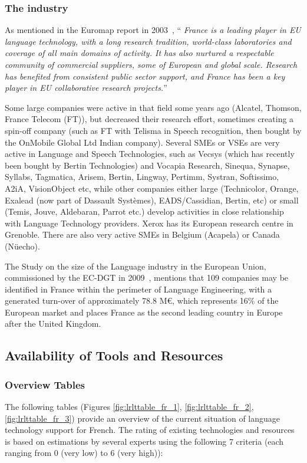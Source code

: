 \begin{multicols}{2}
\subsubsection{The industry}

As mentioned in the Euromap report in 2003~\cite{euromap}, ``{\em
  France is a leading player in EU language technology, with a long
  research tradition, world-class laboratories and coverage of all
  main domains of activity. It has also nurtured a respectable
  community of commercial suppliers, some of European and global
  scale. Research has benefited from consistent public sector support,
  and France has been a key player in EU collaborative research
  projects.}''

Some large companies were active in that field some years ago
(Alcatel, Thomson, France Telecom (FT)), but decreased their research
effort, sometimes creating a spin-off company (such as FT with Telisma
in Speech recognition, then bought by the OnMobile Global Ltd Indian
company). Several SMEs or VSEs are very active in Language and Speech
Technologies, such as Vecsys (which has recently been bought by Bertin
Technologies) and Vocapia Research, Sinequa, Synapse, Syllabs,
Tagmatica, Arisem, Bertin, Lingway, Pertimm, Systran, Softissimo,
A2iA, VisionObject etc, while other companies either large
(Technicolor, Orange, Exalead (now part of Dassault Systèmes),
EADS/Cassidian, Bertin, etc) or small (Temis, Jouve, Aldebaran, Parrot
etc.) develop activities in close relationship with Language
Technology providers. Xerox has its European research centre in
Grenoble. There are also very active SMEs in Belgium (Acapela) or
Canada (Nüecho).

The Study on the size of the Language industry in the European Union,
commissioned by the EC-DGT in 2009~\cite{dgt08}, mentions that 109 companies may
be identified in France within the perimeter of Language Engineering,
with a generated turn-over of approximately 78.8 M€, which represents
16\% of the European market and places France as the second leading
country in Europe after the United Kingdom.

\subsection{Availability of Tools and Resources}

\subsubsection{Overview Tables}
The following tables (Figures \ref{fig:lrlttable_fr_1}, \ref{fig:lrlttable_fr_2}, \ref{fig:lrlttable_fr_3}) provide an overview of the current situation of
language technology support for French. The rating of existing
technologies and resources is based on estimations by several experts
using the following 7 criteria (each ranging from 0 (very low) to 6
(very high)):


\end{multicols}
